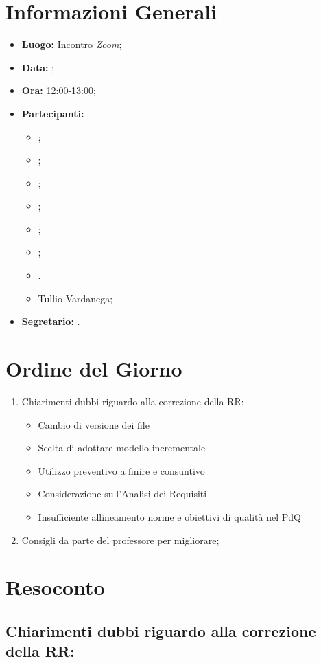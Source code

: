 \section{Informazioni Generali}
\begin{itemize}
\item \textbf{Luogo:} Incontro \textit{Zoom};
\item \textbf{Data:} \Data;
\item \textbf{Ora:} 12:00-13:00;
\item \textbf{Partecipanti:}
	\begin{itemize}
		\item \BL{}; 
		\item \FF{};
		\item \MM{}; 
		\item \PC{};
		\item \TG{};
		\item \TL{};
		\item \VD{}.
		\item Tullio Vardanega;
	\end{itemize} 
\item \textbf{Segretario:} \MM{}.
\end{itemize}

\section{Ordine del Giorno}
\begin{enumerate}
	\item Chiarimenti dubbi riguardo alla correzione della RR:
	\begin{itemize}
        \item Cambio di versione dei file
        \item Scelta di adottare modello incrementale
        \item Utilizzo preventivo a finire e consuntivo
        \item Considerazione sull'Analisi dei Requisiti
        \item Insufficiente allineamento norme e obiettivi di qualità nel PdQ
    \end{itemize}
	\item Consigli da parte del professore per migliorare;
\end{enumerate}

\section{Resoconto}
\subsection{Chiarimenti dubbi riguardo alla correzione della RR:}
